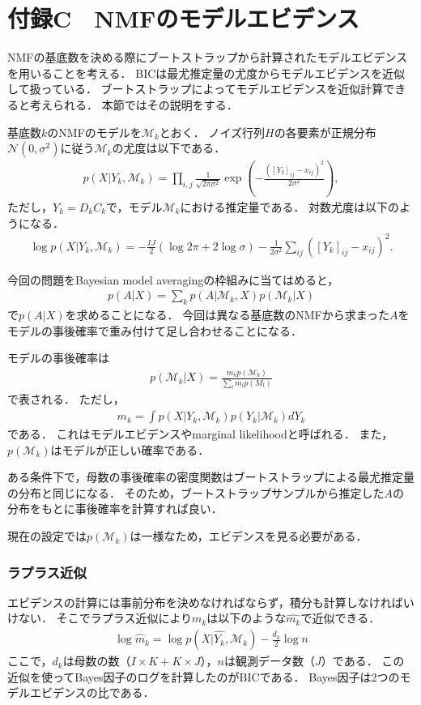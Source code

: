 \chapter{付録C　NMFのモデルエビデンス}
NMFの基底数を決める際にブートストラップから計算されたモデルエビデンスを用いることを考える．
BICは最尤推定量の尤度からモデルエビデンスを近似して扱っている．
ブートストラップによってモデルエビデンスを近似計算できると考えられる．
本節ではその説明をする．

基底数$k$のNMFのモデルを$\mathcal{M}_k$とおく．
ノイズ行列$H$の各要素が正規分布$\mathcal{N} (0, \sigma^2)$に従う$\mathcal{M}_k$の尤度は以下である．
\begin{align}
	p(X | Y_k, \mathcal{M}_k) = \prod_{i,j} \frac{1}{\sqrt{2 \pi \sigma^2}} \exp(-\frac{([Y_k]_{ij} - x_{ij})^2}{2 \sigma^2}),
\end{align}
ただし，$Y_k = D_k C_k$で，モデル$\mathcal{M}_k$における推定量である．
対数尤度は以下のようになる．
\begin{align}
	\log p(X | Y_k, \mathcal{M}_k) = - \frac{IJ}{2} (\log 2\pi + 2 \log \sigma) - \frac{1}{2 \sigma^2} \sum_{ij}([Y_k]_{ij} - x_{ij})^2.
\end{align}


今回の問題をBayesian model averagingの枠組みに当てはめると，
\begin{align}
	p(A|X) = \sum_k p(A|\mathcal{M}_k, X) p(\mathcal{M}_k | X)
\end{align}
で$p(A|X)$を求めることになる．
今回は異なる基底数のNMFから求まった$A$をモデルの事後確率で重み付けて足し合わせることになる．

モデルの事後確率は
\begin{align}
	p(\mathcal{M}_k|X) = \frac{m_k p(\mathcal{M}_k)}{\sum_l m_l p(M_l)}
\end{align}
で表される．
ただし，
\begin{align}
	m_k = \int p(X | Y_k, \mathcal{M}_k) p(Y_k| \mathcal{M}_k) dY_k
	\label{eq:evidence}
\end{align}
である．
これはモデルエビデンスやmarginal likelihoodと呼ばれる．
また，$p(\mathcal{M}_k)$はモデルが正しい確率である．

ある条件下で，母数の事後確率の密度関数はブートストラップによる最尤推定量の分布と同じになる．
そのため，ブートストラップサンプルから推定した$A$の分布をもとに事後確率を計算すれば良い．

現在の設定では$p(\mathcal{M}_k)$は一様なため，エビデンスを見る必要がある．

\subsection{ラプラス近似}
エビデンスの計算には事前分布を決めなければならず，積分も計算しなければいけない．
そこでラプラス近似により$m_k$は以下のような$\hat{m_k}$で近似できる．
\begin{align}
	\log \hat{m}_k = \log p(X | \hat{Y_k}, \mathcal{M}_k) - \frac{d_k}{2} \log n
	\label{eq:simm}
\end{align}
ここで，$d_k$は母数の数（$I \times K + K \times J$），$n$は観測データ数（$J$）である．
この近似を使ってBayes因子のログを計算したのがBICである．
Bayes因子は2つのモデルエビデンスの比である．

